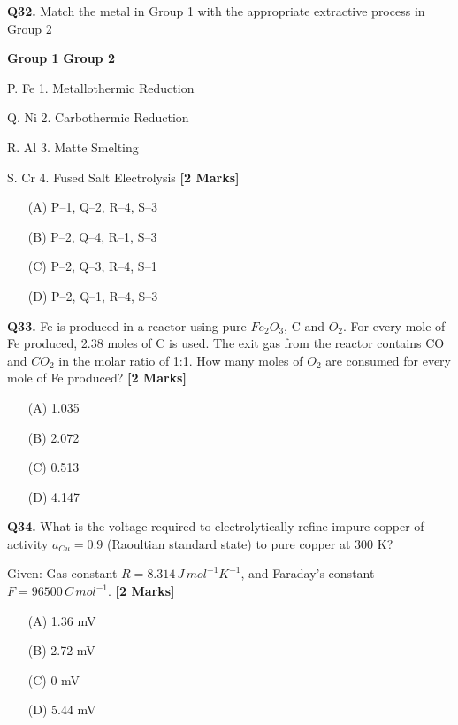 \documentclass[11pt]{article}
\newcommand{\questionb}[2]{
    \noindent\textbf{Q#2.} #1 \hfill \textbf{[2 Marks]}
}
\begin{document}
\questionb{Match the metal in Group 1 with the appropriate extractive process in Group 2  

\textbf{Group 1} \hspace{2cm} \textbf{Group 2}  

P. Fe \hspace{2.8cm} 1. Metallothermic Reduction  

Q. Ni \hspace{2.7cm} 2. Carbothermic Reduction  

R. Al \hspace{2.8cm} 3. Matte Smelting  

S. Cr \hspace{2.8cm} 4. Fused Salt Electrolysis}{32}
\begin{enumerate}
    \item[(A)] P–1, Q–2, R–4, S–3  
    \item[(B)] P–2, Q–4, R–1, S–3  
    \item[(C)] P–2, Q–3, R–4, S–1  
    \item[(D)] P–2, Q–1, R–4, S–3  
\end{enumerate}
\vspace{0.5cm}

\questionb{Fe is produced in a reactor using pure \(Fe_2O_3\), C and \(O_2\). For every mole of Fe produced, 2.38 moles of C is used. The exit gas from the reactor contains CO and \(CO_2\) in the molar ratio of 1:1. How many moles of \(O_2\) are consumed for every mole of Fe produced?}{33}
\begin{enumerate}
    \item[(A)] 1.035  
    \item[(B)] 2.072  
    \item[(C)] 0.513  
    \item[(D)] 4.147  
\end{enumerate}
\vspace{0.5cm}

\questionb{What is the voltage required to electrolytically refine impure copper of activity \(a_{Cu} = 0.9\) (Raoultian standard state) to pure copper at 300 K?  

Given: Gas constant \(R = 8.314\, J\, mol^{-1} K^{-1}\), and Faraday’s constant \(F = 96500\, C\, mol^{-1}\).}{34}
\begin{enumerate}
    \item[(A)] 1.36 mV  
    \item[(B)] 2.72 mV  
    \item[(C)] 0 mV  
    \item[(D)] 5.44 mV  
\end{enumerate}
\vspace{0.5cm}
\end{document}
